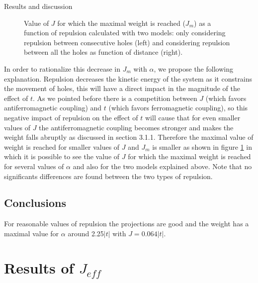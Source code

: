 \documentclass[12pt,twoside]{report}
\begin{document}
\begin{chapter}{Results and discussion}
\begin{figure}[h!]
\begin{minipage}{0.4\textwidth}
		\end{minipage}
		\caption{\label{fig_jv1n} Value of $J$ for which the maximal weight is reached ($J_m$) as a function of repulsion calculated with two models: only considering repulsion between consecutive holes (left) and considering repulsion between all the holes as function of distance (right). }
	\end{figure}

	In order to rationalize this decrease in $J_m$ with $\alpha$, we propose the
	following explanation.  Repulsion decreases the kinetic energy of the system
	as it constrains the movement of holes, this will have a direct impact in
	the magnitude of the effect of $t$. As we pointed before there is a
	competition between $J$ (which favors antiferromagnetic coupling) and $t$
	(which favors ferromagnetic coupling), so this negative impact of repulsion
	on the effect of $t$ will cause that for even smaller values of $J$ the
	antiferromagnetic coupling becomes stronger and makes the weight falls
	abruptly as discussed in section 3.1.1.  Therefore the maximal value of
	weight is reached for smaller values of $J$ and $J_m$ is smaller as shown in
	figure \ref{fig_jv1n} in which it is possible to see the value of $J$ for
	which the maximal weight is reached for several values of $\alpha$ and also
	for the two models explained above. Note that no significants differences
	are found between the two types of repulsion.


	\subsection{Conclusions}

	For reasonable values of repulsion the projections are good and the weight
	has a maximal value for $\alpha$ around 2.25$|t|$ with $J=0.064|t|$.
	
	\section{Results of $J_{eff}$}


\end{chapter}
\end{document}
